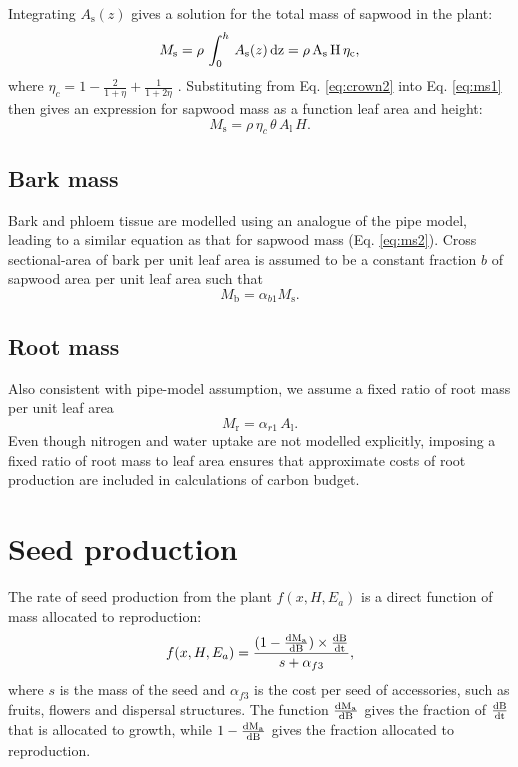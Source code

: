 \documentclass[10pt,twoside]{article}
\begin{document}
Integrating \(A_\textrm{s}(z)\) gives a solution for the total mass of
sapwood in the plant:
\begin{equation}\label{eq:ms1}
M_\textrm{s} = \rho \, \int_0^h \, A_\textrm{s}(z) \, \rm{d}z = \rho \, A_\textrm{s} \, H \, \eta_c,
\end{equation}
where \(\eta_c = 1 - \frac{2}{1 + \eta} + \frac{1}{1 + 2\eta}\)
\citep{Yokozawa-1995}. Substituting from Eq. \ref{eq:crown2} into Eq.
\ref{eq:ms1} then gives an expression for sapwood mass as a function
leaf area and height:
\begin{equation}\label{eq:ms2}
M_\textrm{s} = \rho \, \eta_c \, \theta \, A_\textrm{l} \, H.
\end{equation}

\subsection{Bark mass}\label{bark-mass}

Bark and phloem tissue are modelled using an analogue of the pipe model,
leading to a similar equation as that for sapwood mass (Eq.
\ref{eq:ms2}). Cross sectional-area of bark per unit leaf area is
assumed to be a constant fraction \(b\) of sapwood area per unit leaf
area such that
\begin{equation}\label{eq:mb}
M_\textrm{b} = \alpha_{b1} M_\textrm{s}.
\end{equation}

\subsection{Root mass}\label{root-mass}

Also consistent with pipe-model assumption, we assume a fixed ratio of
root mass per unit leaf area
\begin{equation}\label{eq:mr}
M_\textrm{r} = \alpha_{r1} \, A_\textrm{l}.
\end{equation}
Even though nitrogen and water uptake are not modelled explicitly,
imposing a fixed ratio of root mass to leaf area ensures that
approximate costs of root production are included in calculations of
carbon budget.

\section{Seed production}\label{seed-production}

The rate of seed production from the plant \(f(x, H, E_a)\) is a direct
function of mass allocated to reproduction:
\begin{equation}\label{eq:fecundity}
f(x, H, E_a) = \frac{(1 - \frac{\rm{d}M_\textrm{a}}{\rm{d}B}) \times \frac{\rm{d}B}{\rm{d}t}}{
  s + \alpha_{f3}},
\end{equation}
where \(s\) is the mass of the seed and \(\alpha_{f3}\) is the cost
per seed of accessories, such as fruits, flowers and dispersal
structures. The function $\frac{\rm{d}M_\textrm{a}}{\rm{d}B}$ gives the fraction
of $\frac{\rm{d}B}{\rm{d}t}$ that is allocated to growth, while
$1-\frac{\rm{d}M_\textrm{a}}{\rm{d}B}$ gives the  fraction allocated
to reproduction.
\end{document}
